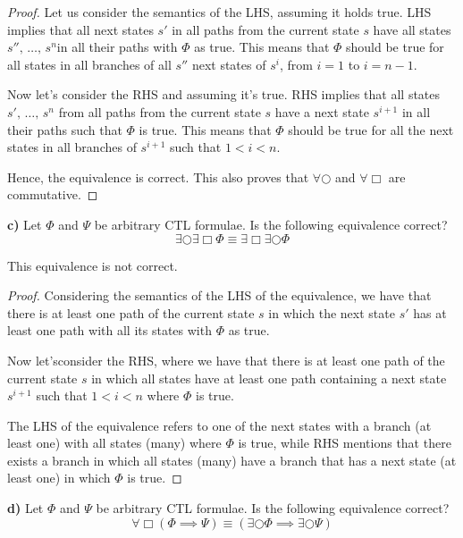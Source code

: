 \documentclass[titlepage, letterpaper, fleqn]{article}
\begin{document}
\begin{proof}
Let us consider the semantics of the LHS, assuming it holds true.
LHS implies that all next states \(s'\) in all paths from the current state \(s\) have all states \(s'',\, \dots,\, s^n\)in all their paths with \(\Phi\) as true. This means that \(\Phi\) should be true for all states in all branches of all \(s''\) next states of \(s^i\), from \(i=1\) to \(i=n-1\).

Now let's consider the RHS and assuming it's true.
RHS implies that all states \(s', \, \dots , \, s^n\) from all paths from the current state \(s\) have a next state \(s^{i+1}\) in all their paths such that \(\Phi\) is true. This means that \(\Phi\) should be true for all the next states in all branches of \(s^{i+1}\) such that \(1<i<n\).

Hence, the equivalence is correct. This also proves that \(\forall \bigcirc\) and \(\forall \Box\) are commutative.

\end{proof}

{\large \textbf{c)} Let \(\Phi\) and \(\Psi\) be arbitrary CTL formulae. Is the following equivalence correct?
\[\exists \bigcirc \exists \Box \Phi \equiv \exists \Box \exists \bigcirc \Phi\]}

This equivalence is not correct.

\begin{proof}
Considering the semantics of the LHS of the equivalence, we have that there is at least one path of the current state \(s\) in which the next state \(s'\) has at least one path with all its states with \(\Phi\) as true.

Now let'sconsider the RHS, where we have that there is at least one path of the current state \(s\) in which all states have at least one path containing a next state \(s^{i+1}\) such that \(1<i<n\) where \(\Phi\) is true.

The LHS of the equivalence refers to one of the next states with a branch (at least one) with all states (many) where \(\Phi\) is true, while RHS mentions that there exists a branch in which all states (many) have a branch that has a next state (at least one) in which \(\Phi\) is true.
\end{proof}

{\large \textbf{d)} Let \(\Phi\) and \(\Psi\) be arbitrary CTL formulae. Is the following equivalence correct?
\[\forall \Box(\Phi \implies \Psi) \equiv (\exists \bigcirc \Phi \implies \exists \bigcirc \Psi)\]}
\end{document}
